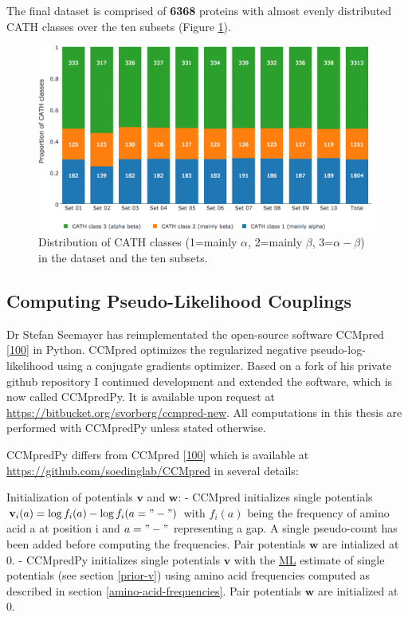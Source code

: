 \documentclass[11pt,a4paper,twoside]{book}
\renewcommand{\v}{\mathbf{v}}
\newcommand{\w}{\mathbf{w}}
\theoremstyle{definition}
\theoremstyle{definition}
\theoremstyle{remark}
\begin{document}
The final dataset is comprised of \textbf{6368} proteins with almost
evenly distributed CATH classes over the ten subsets (Figure
\ref{fig:dataset-cath-topologies}).





\begin{figure}
\includegraphics[width=1\linewidth]{img/dataset_statistics/cath_topologies_stacked_reative_notitle} \caption{Distribution of CATH classes
(1=mainly \(\alpha\), 2=mainly \(\beta\), 3=\(\alpha-\beta\)) in the
dataset and the ten subsets. }\label{fig:dataset-cath-topologies}
\end{figure}

\subsection{Computing Pseudo-Likelihood
Couplings}\label{diff-ccmpred-ccmpredpy}

Dr Stefan Seemayer has reimplementated the open-source software CCMpred
{[}\protect\hyperlink{ref-Seemayer2014}{100}{]} in Python. CCMpred
optimizes the regularized negative pseudo-log-likelihood using a
conjugate gradients optimizer. Based on a fork of his private github
repository I continued development and extended the software, which is
now called CCMpredPy. It is available upon request at
\url{https://bitbucket.org/svorberg/ccmpred-new}. All computations in
this thesis are performed with CCMpredPy unless stated otherwise.

CCMpredPy differs from CCMpred
{[}\protect\hyperlink{ref-Seemayer2014}{100}{]} which is available at
\url{https://github.com/soedinglab/CCMpred} in several details:

Initialization of potentials \(\v\) and \(\w\): - CCMpred initializes
single potentials \(\v_i(a) = \log f_i(a) - \log f_i(a= "-")\) with
\(f_i(a)\) being the frequency of amino acid a at position i and
\(a="-"\) representing a gap. A single pseudo-count has been added
before computing the frequencies. Pair potentials \(\w\) are intialized
at 0. - CCMpredPy initializes single potentials \(\v\) with the
\protect\hyperlink{abbrev}{ML} estimate of single potentials (see
section \ref{prior-v}) using amino acid frequencies computed as
described in section \ref{amino-acid-frequencies}. Pair potentials
\(\w\) are initialized at 0.
\end{document}
